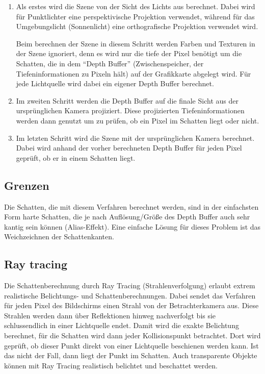 \begin{enumerate}
 \item Als erstes wird die Szene von der Sicht des Lichts aus berechnet. Dabei wird für Punktlichter
       eine perspektivische Projektion verwendet, während für das Umgebungslicht (Sonnenlicht) eine
       orthografische Projektion verwendet wird.

       Beim berechnen der Szene in diesem Schritt werden Farben und Texturen in der Szene ignoriert,
       denn es wird nur die tiefe der Pixel benötigt um die Schatten, die in dem "`Depth Buffer"'
       (Zwischenspeicher, der Tiefeninformationen zu Pixeln hält) auf der Grafikkarte abgelegt wird.
       Für jede Lichtquelle wird dabei ein eigener Depth Buffer berechnet.
 \item Im zweiten Schritt werden die Depth Buffer auf die finale Sicht aus der ursprünglichen Kamera
       projiziert. Diese projizierten Tiefeninformationen werden dann genutzt um zu prüfen, ob ein
       Pixel im Schatten liegt oder nicht.
 \item Im letzten Schritt wird die Szene mit der ursprünglichen Kamera berechnet. Dabei wird anhand
       der vorher berechneten Depth Buffer für jeden Pixel geprüft, ob er in einem Schatten liegt.
\end{enumerate}

\subsection*{Grenzen}

Die Schatten, die mit diesem Verfahren berechnet werden, sind in der einfachsten Form harte Schatten,
die je nach Auflösung/Größe des Depth Buffer auch sehr kantig sein können (Alias-Effekt). Eine
einfache Lösung für dieses Problem ist das Weichzeichnen der Schattenkanten.

\subsection{Ray tracing}

Die Schattenberechnung durch Ray Tracing (Strahlenverfolgung) erlaubt extrem realistische Belichtungs-
und Schattenberechnungen.
Dabei sendet das Verfahren für jeden Pixel des Bildschirms einen Strahl von der Betrachterkamera aus.
Diese Strahlen werden dann über Reflektionen hinweg nachverfolgt bis sie schlussendlich in einer
Lichtquelle endet. Damit wird die exakte Belichtung berechnet, für die Schatten wird dann jeder
Kollisionspunkt betrachtet. Dort wird geprüft, ob dieser Punkt direkt von einer Lichtquelle
beschienen werden kann. Ist das nicht der Fall, dann liegt der Punkt im Schatten. Auch transparente
Objekte können mit Ray Tracing realistisch belichtet und beschattet werden.

